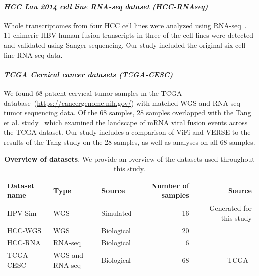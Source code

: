 \documentclass[10pt]{article}
\begin{document}
\paragraph{\emph{HCC Lau 2014 cell line RNA-seq dataset (HCC-RNAseq)}}
Whole transcriptomes from four HCC cell lines were analyzed using RNA-seq~\cite{Lau2014}.  11 chimeric HBV-human fusion transcripts in three of the cell lines were detected and validated using Sanger sequencing.  Our study included the original six cell line RNA-seq data.  

\paragraph{\emph{TCGA Cervical cancer datasets (TCGA-CESC)}}
We found 68 patient cervical tumor samples in the TCGA database~(\url{https://cancergenome.nih.gov/}) with matched WGS and RNA-seq tumor sequencing data.  Of the 68 samples, 28 samples overlapped with the Tang et al. study~\cite{Tang2013} which examined the landscape of mRNA viral fusion events across the TCGA dataset.  Our study includes a comparison of ViFi and VERSE to the results of the Tang study on the 28 samples, as well as analyses on all 68 samples.


\begin{table}[htb]
\centering
\caption{\textbf{Overview of datasets}.  We provide an overview of the datasets used throughout this study.  }
\label{table:data}
\begin{tabular}{|l|l|l|r|r|}
\hline
Dataset name & Type & Source & Number of samples & Source \\ \hline
HPV-Sim & WGS &Simulated& 16 & Generated for this study \\ \hline
HCC-WGS & WGS & Biological&20 & ~\cite{Sung2012} \\ \hline
HCC-RNA & RNA-seq & Biological&6 & ~\cite{Lau2014} \\ \hline
TCGA-CESC & WGS and RNA-seq &Biological& 68 & TCGA~\cite{TODO} \\ \hline 
\end{tabular}
\end{table}

\end{document}
